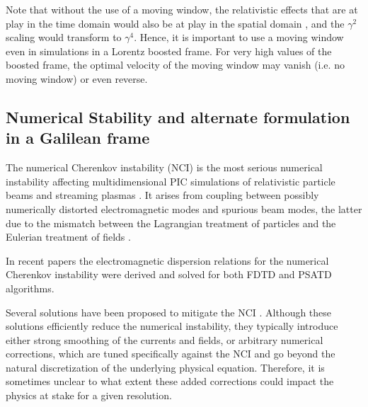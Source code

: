 Note that without the use of a moving window, the relativistic effects that are at play in the time domain would also be at play in the spatial domain \cite{Vayprl07}, and the $\gamma^2$ scaling would transform to $\gamma^4$. Hence, it is important to use a moving window even in simulations in a Lorentz boosted frame. For very high values of the boosted frame, the optimal velocity of the moving window may vanish (i.e. no moving window) or even reverse.

\subsection{Numerical Stability and alternate formulation in a Galilean frame}

The numerical Cherenkov instability (NCI) \cite{Godfreyjcp74}
is the most serious numerical instability affecting multidimensional
PIC simulations of relativistic particle beams and streaming plasmas
\cite{Martinscpc10,VayAAC2010,Vayjcp2011,Spitkovsky:Icnsp2011,GodfreyJCP2013,XuJCP2013}.
It arises from coupling between possibly numerically distorted electromagnetic modes and spurious
beam modes, the latter due to the mismatch between the Lagrangian
treatment of particles and the Eulerian treatment of fields \cite{Godfreyjcp75}.

In recent papers the electromagnetic dispersion
relations for the numerical Cherenkov instability were derived and solved for both FDTD \cite{GodfreyJCP2013,GodfreyJCP2014_FDTD}
and PSATD \cite{GodfreyJCP2014_PSATD,GodfreyIEEE2014} algorithms.

Several solutions have been proposed to mitigate the NCI \cite{GodfreyJCP2014,GodfreyIEEE2014,GodfreyJCP2014_PSATD,GodfreyCPC2015,YuCPC2015,YuCPC2015-Circ}. Although
these solutions efficiently reduce the numerical instability,
they typically introduce either strong smoothing of the currents and
fields, or arbitrary numerical corrections, which are
tuned specifically against the NCI and go beyond the
natural discretization of the underlying physical equation. Therefore,
it is sometimes unclear to what extent these added corrections could impact the
physics at stake for a given resolution.

